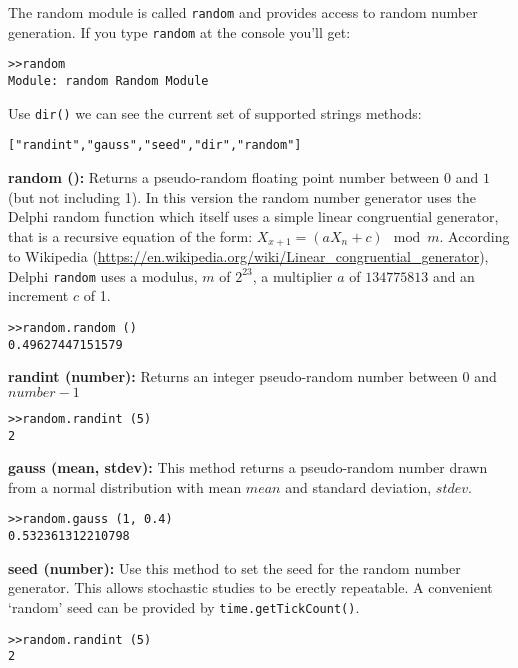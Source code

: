 The random module is called {\tt random} and provides access to random number generation. If you type {\tt random} at the console you'll get:

\begin{lstlisting}
>>random
Module: random Random Module
\end{lstlisting}

Use {\tt dir()} we can see the current set of supported strings methods:

\begin{lstlisting}
["randint","gauss","seed","dir","random"]
\end{lstlisting}

\colorbox{blue!10}{\bf random ():} Returns a pseudo-random floating point number between $0$ and $1$ (but not including 1). In this version the random number generator uses the Delphi random function which itself uses a simple linear congruential generator, that is a recursive equation of the form: $ X_{x+1} = (a X_n + c) \mod m$. According to Wikipedia (\url{https://en.wikipedia.org/wiki/Linear_congruential_generator}), Delphi {\tt random} uses a modulus, $m$ of $2^{23}$, a multiplier $a$ of $134775813$ and an increment $c$ of 1.

\begin{lstlisting}
>>random.random ()
0.49627447151579
\end{lstlisting}


\colorbox{blue!10}{\bf randint (number):} Returns an integer pseudo-random number between $0$ and $number - 1$

\begin{lstlisting}
>>random.randint (5)
2
\end{lstlisting}


\colorbox{blue!10}{\bf gauss (mean, stdev):} This method returns a pseudo-random number drawn from a normal distribution with mean $mean$ and standard deviation, $stdev$.

\begin{lstlisting}
>>random.gauss (1, 0.4)
0.532361312210798
\end{lstlisting}


\colorbox{blue!10}{\bf seed (number):} Use this method to set the seed for the random number generator. This allows stochastic studies to be erectly repeatable.  A convenient `random' seed can be provided by {\tt time.getTickCount()}.
\begin{lstlisting}
>>random.randint (5)
2
\end{lstlisting}


%
%

\begin{center}
\end{center} 